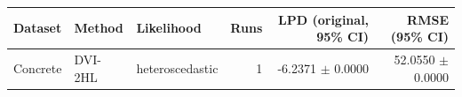 \begin{tabular}{lllrrr}
\toprule
Dataset & Method & Likelihood & Runs & LPD (original, 95\% CI) & RMSE (95\% CI) \\
\midrule
Concrete & DVI-2HL & heteroscedastic & 1 & -6.2371 $\pm$ 0.0000 & 52.0550 $\pm$ 0.0000 \\
\bottomrule
\end{tabular}
